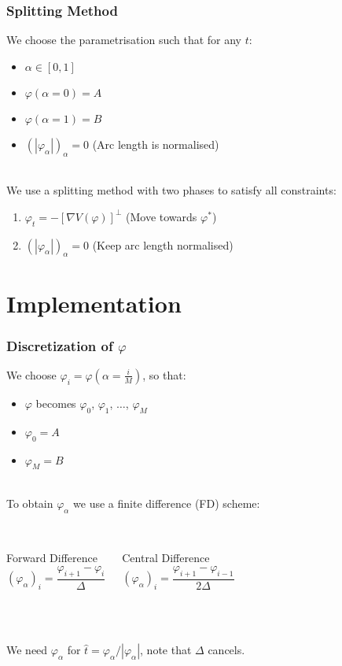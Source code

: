 \documentclass{beamer}
\renewcommand{\phi}{\varphi}
\renewcommand{\(}{\left(}
\renewcommand{\)}{\right)}
\begin{document}
\begin{frame}
\frametitle{Splitting Method}
We choose the parametrisation such that for any $t$:
\begin{itemize}
\item $\alpha\in [0,1]$
\item $\phi(\alpha=0)=A$ 
\item $\phi(\alpha=1)=B$
\item $(|\phi_\alpha|)_\alpha = 0$ \hspace{3em} (Arc length is normalised)
\end{itemize}
~\\
We use a splitting method with two phases to satisfy all constraints: 
\begin{enumerate}
\item $\phi_t=-[\nabla V(\phi)]^\bot$ \hspace{3em} (Move towards $\phi^*$)
\item $(|\phi_\alpha|)_\alpha = 0$ \hspace{3em} (Keep arc length normalised)
\end{enumerate}
\end{frame}

\section{Implementation}

\begin{frame}
\frametitle{Discretization of $\phi$}
We choose $\phi_i = \phi(\alpha = \frac{i}{M})$, so that:
\begin{itemize}
\item $\phi$ becomes $\phi_0$, $\phi_1$, $\dots$, $\phi_M$
\item  $\phi_0 = A$
\item $\phi_M = B$
\end{itemize}
~\\
To obtain $\phi_\alpha$ we use a finite difference (FD) scheme:\\
~\\
\begin{columns}[c]
\begin{block}{Forward Difference}
$$(\phi_\alpha)_i = \frac{\phi_{i+1}-\phi_i}{\Delta}$$
\end{block}
\begin{block}{Central Difference}
$$(\phi_\alpha)_i = \frac{\phi_{i+1}-\phi_{i-1}}{2\Delta}$$
\end{block}%
\end{columns}
~\\
~\\
We need $\phi_\alpha$ for $\hat t = \phi_\alpha / |\phi_\alpha|$, note that $\Delta$ cancels.
\end{frame}
\end{document}
